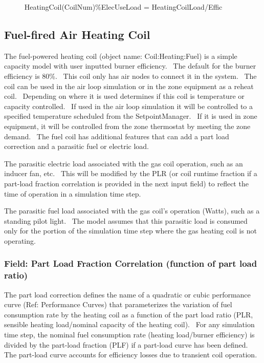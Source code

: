 ~~~~~ HeatingCoil(CoilNum)\%ElecUseLoad = HeatingCoilLoad/Effic

\subsection{Fuel-fired Air Heating Coil}\label{gas-air-heating-coil}

The fuel-powered heating coil (object name: Coil:Heating:Fuel) is a simple capacity model with user inputted burner efficiency.~ The default for the burner efficiency is 80\%.~ This coil only has air nodes to connect it in the system.~ The coil can be used in the air loop simulation or in the zone equipment as a reheat coil.~ Depending on where it is used determines if this coil is temperature or capacity controlled.~ If used in the air loop simulation it will be controlled to a specified temperature scheduled from the SetpointManager.~ If it is used in zone equipment, it will be controlled from the zone thermostat by meeting the zone demand.~ The fuel coil has additional features that can add a part load correction and a parasitic fuel or electric load.

The parasitic electric load associated with the gas coil operation, such as an inducer fan, etc.~ This will be modified by the PLR (or coil runtime fraction if a part-load fraction correlation is provided in the next input field) to reflect the time of operation in a simulation time step.

The parasitic fuel load associated with the gas coil's operation (Watts), such as a standing pilot light.~ The model assumes that this parasitic load is consumed only for the portion of the simulation time step where the gas heating coil is not operating.

\subsubsection{Field: Part Load Fraction Correlation (function of part load ratio)}\label{field-part-load-fraction-correlation-function-of-part-load-ratio}

The part load correction defines the name of a quadratic or cubic performance curve (Ref: Performance Curves) that parameterizes the variation of fuel consumption rate by the heating coil as a function of the part load ratio (PLR, sensible heating load/nominal capacity of the heating coil).~ For any simulation time step, the nominal fuel consumption rate (heating load/burner efficiency) is divided by the part-load fraction (PLF) if a part-load curve has been defined.~ The part-load curve accounts for efficiency losses due to transient coil operation.

